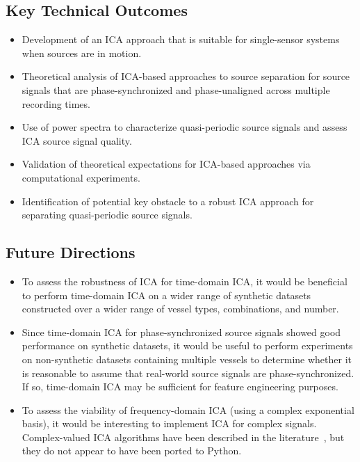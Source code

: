 \documentclass[10pt]{article}
\begin{document}
\subsection*{Key Technical Outcomes}
\begin{itemize}
    \item Development of an ICA approach that is suitable for single-sensor systems when
        sources are in motion.

    \item Theoretical analysis of ICA-based approaches to source separation for source
        signals that are phase-synchronized and phase-unaligned across multiple recording
        times.

    \item Use of power spectra to characterize quasi-periodic source signals and assess
        ICA source signal quality.

    \item Validation of theoretical expectations for ICA-based approaches via computational
        experiments.

    \item Identification of potential key obstacle to a robust ICA approach for separating
        quasi-periodic source signals.
\end{itemize}

\subsection*{Future Directions}
\begin{itemize}
    \item To assess the robustness of ICA for time-domain ICA, it would be beneficial to
        perform time-domain ICA on a wider range of synthetic datasets constructed over a
        wider range of vessel types, combinations, and number.

    \item Since time-domain ICA for phase-synchronized source signals showed good
        performance on synthetic datasets, it would be useful to perform experiments
        on non-synthetic datasets containing multiple vessels to determine whether it
        is reasonable to assume that real-world source signals are phase-synchronized.
        If so, time-domain ICA may be sufficient for feature engineering purposes.

    \item To assess the viability of frequency-domain ICA (using a complex exponential
        basis), it would be interesting to implement ICA for complex signals.
        Complex-valued ICA algorithms have been described in the
        literature~\cite{novey:2006,novey:2007,novey:2008,novey:2008b}, but they do not
        appear to have been ported to Python.
\end{itemize}

\printbibliography
\end{document}
